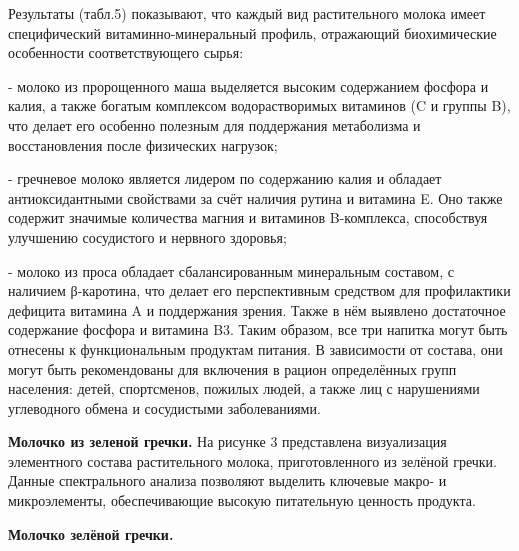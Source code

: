 \begin{multicols}{2}
Результаты (табл.5) показывают, что каждый вид растительного молока
имеет специфический витаминно-минеральный профиль, отражающий
биохимические особенности соответствующего сырья:

- молоко из пророщенного маша выделяется высоким содержанием фосфора и
калия,
а также богатым комплексом водорастворимых витаминов (C и группы B), что
делает его особенно полезным для поддержания метаболизма и
восстановления после физических нагрузок;

- гречневое молоко является лидером по содержанию калия и обладает
антиоксидантными свойствами за счёт наличия рутина и витамина E. Оно
также содержит значимые количества магния и витаминов B-комплекса,
способствуя улучшению сосудистого и нервного здоровья;

- молоко из проса обладает сбалансированным минеральным составом, с
наличием β-каротина, что делает его перспективным средством для
профилактики дефицита витамина A и поддержания зрения. Также в нём
выявлено достаточное содержание фосфора и витамина B3.
Таким образом, все три напитка могут быть отнесены к функциональным
продуктам питания. В зависимости от состава, они могут быть
рекомендованы для включения в рацион определённых групп населения:
детей, спортсменов, пожилых людей, а также лиц с нарушениями углеводного
обмена и сосудистыми заболеваниями.

{\bfseries Молочко из зеленой гречки.} На рисунке 3 представлена
визуализация элементного состава растительного молока, приготовленного
из зелёной гречки. Данные спектрального анализа позволяют выделить
ключевые макро- и микроэлементы, обеспечивающие высокую питательную
ценность продукта.
\end{multicols}

{\bfseries Молочко зелёной гречки.}



